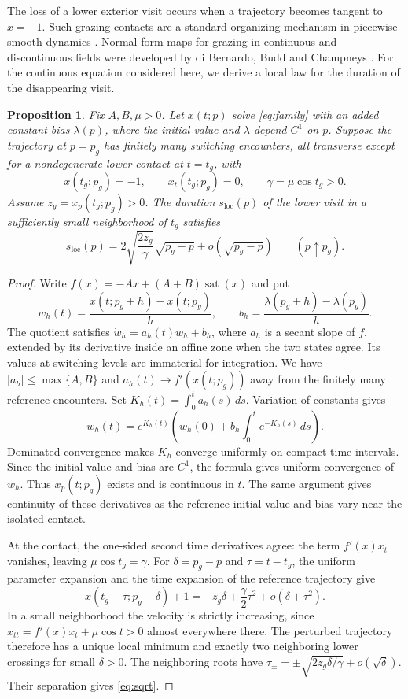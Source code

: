 \documentclass[11pt,a4paper]{article}
\newtheorem{proposition}{Proposition}
\newcommand{\sat}{\operatorname{sat}}
\begin{document}
The loss of a lower exterior visit occurs when a trajectory becomes
tangent to $x=-1$. Such grazing contacts are a standard organizing
mechanism in piecewise-smooth dynamics \cite{diBernardo2008,Nordmark1991}.
Normal-form maps for grazing in continuous and discontinuous fields
were developed by di Bernardo, Budd and Champneys \cite{diBernardo2001}.
For the continuous equation considered here, we derive a local law
for the duration of the disappearing visit.
\begin{proposition}\label{prop:grazing}
Fix $A,B,\mu>0$. Let $x(t;p)$ solve \eqref{eq:family} with an added constant bias
$\lambda(p)$, where the initial value and $\lambda$ depend $C^1$ on $p$.
Suppose the trajectory at $p=p_g$ has finitely many switching encounters,
all transverse except for a nondegenerate lower contact at $t=t_g$, with
\[
 x(t_g;p_g)=-1,\qquad x_t(t_g;p_g)=0,\qquad
 \gamma=\mu\cos t_g>0.
\]
Assume $z_g=x_p(t_g;p_g)>0$. The duration $s_{\mathrm{loc}}(p)$ of the
lower visit in a sufficiently small neighborhood of $t_g$ satisfies
\begin{equation}\label{eq:sqrt}
 s_{\mathrm{loc}}(p)=2\sqrt{\frac{2z_g}{\gamma}}\sqrt{p_g-p}
       +o(\sqrt{p_g-p})\qquad(p\uparrow p_g).
\end{equation}
\end{proposition}
\begin{proof}
Write $f(x)=-Ax+(A+B)\sat(x)$ and put
\[
 w_h(t)=\frac{x(t;p_g+h)-x(t;p_g)}h,\qquad
 b_h=\frac{\lambda(p_g+h)-\lambda(p_g)}h.
\]
The quotient satisfies $\dot w_h=a_h(t)w_h+b_h$, where $a_h$ is
a secant slope of $f$, extended by its derivative inside an affine zone
when the two states agree. Its values at switching levels are immaterial
for integration. We have $|a_h|\leq\max\{A,B\}$ and
$a_h(t)\to f'(x(t;p_g))$ away from the finitely many reference encounters.
Set $K_h(t)=\int_0^t a_h(s)\,ds$. Variation of constants gives
\[
 w_h(t)=e^{K_h(t)}
 \left(w_h(0)+b_h\int_0^t e^{-K_h(s)}\,ds\right).
\]
Dominated convergence makes $K_h$ converge uniformly on compact time
intervals. Since the initial value and bias are $C^1$, the formula
gives uniform convergence of $w_h$. Thus $x_p(t;p_g)$ exists and is
continuous in $t$.
The same argument gives continuity of these derivatives as the
reference initial value and bias vary near the isolated contact.

At the contact, the one-sided second time derivatives agree: the term
$f'(x)x_t$ vanishes, leaving $\mu\cos t_g=\gamma$.
For $\delta=p_g-p$ and $\tau=t-t_g$, the uniform parameter expansion
and the time expansion of the reference trajectory give
\[
 x(t_g+\tau;p_g-\delta)+1
 =-z_g\delta+\frac\gamma2\tau^2+o(\delta+\tau^2).
\]
In a small neighborhood the velocity is strictly increasing, since
$x_{tt}=f'(x)x_t+\mu\cos t>0$ almost everywhere there.
The perturbed trajectory therefore has a unique local minimum and
exactly two neighboring lower crossings for small $\delta>0$.
The neighboring roots have
$\tau_\pm=\pm\sqrt{2z_g\delta/\gamma}+o(\sqrt\delta)$.
Their separation gives \eqref{eq:sqrt}.
\end{proof}
\end{document}
